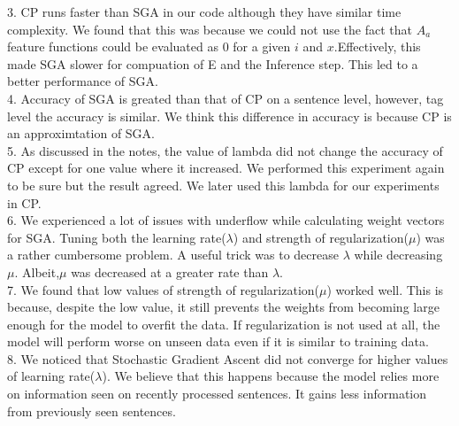 \documentclass[11pt,a4paper,oneside]{article}
\begin{document}
3. CP runs faster than SGA in our code although they have similar time complexity. We found that this was because we could not use the fact that $A_a$ feature functions could be evaluated as $0$ for a given $i$ and $x$.Effectively, this made SGA slower for compuation of E and the Inference step. This led to a better performance of SGA.\\

4. Accuracy of SGA is greated than that of CP on a sentence level, however, tag level the accuracy is similar. We think this difference in accuracy is because CP is an approximtation of SGA.\\

5. As discussed in the notes\cite{classNotes}, the value of lambda did not change the accuracy of CP except for one value where it increased. We performed this experiment again to be sure but the result agreed. We later used this lambda for our experiments in CP.\\

6. We experienced a lot of issues with underflow while calculating weight vectors for SGA. Tuning both the learning rate($\lambda$) and strength of regularization($\mu$) was a rather cumbersome problem. A useful trick was to decrease $\lambda$ while decreasing $\mu$. Albeit,$\mu$ was decreased at a greater rate than  $\lambda$.\\

7. We found that low values of strength of regularization($\mu$) worked well. This is because, despite the low value, it still prevents the weights from becoming large enough for the model to overfit the data. If  regularization is not used at all, the model will perform worse on unseen data even if it is similar to training data. \\

8. We noticed that Stochastic Gradient Ascent did not converge for higher values of learning rate($\lambda$). We believe that this happens because the model relies more on information seen on recently processed sentences. It gains less information from previously seen sentences.\\



\end{document}
